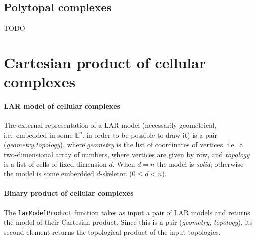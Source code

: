 \documentclass[11pt,oneside]{article}	%
\def\E{\mathbb{E}}
\begin{document}
\subsection{Polytopal complexes}

TODO

\section{Cartesian product of cellular complexes}
\label{sec:product}

\paragraph{LAR model of cellular complexes}

The external representation of a LAR model (necessarily geometrical, i.e.~embedded in some $\E^n$, in order to be possible to draw it) is a pair (\emph{geometry},\emph{topology}), where \emph{geometry} is the list of coordinates of vertices, i.e.~a two-dimensional array of numbers, where vertices are given by row, and \emph{topology} is a list of cells of fixed dimension $d$. When $d=n$ the model is \emph{solid}; otherwise  the model is some emberdded $d$-skeleton ($0\leq d <n$).

\paragraph{Binary product of cellular complexes}
The \texttt{larModelProduct} function takes as input a pair of LAR models and returns the model of their Cartesian product. Since this is a pair (\emph{geometry}, \emph{topology}), its second element returns the topological product of the input topologies.
\end{document}
